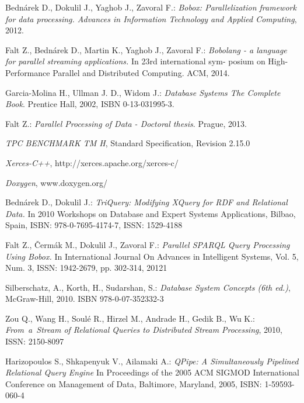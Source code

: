 
\def\bibname{Bibliography}
\begin{thebibliography}{99}
\addcontentsline{toc}{chapter}{\bibname}

  Bednárek D., Dokulil J., Yaghob J., Zavoral F.:
  \emph{Bobox: Parallelization
  framework for data processing. Advances in Information Technology and
  Applied Computing}, 2012.
  
   Falt Z., Bednárek D., Martin K., Yaghob J., Zavoral F.:
  \emph{Bobolang - a language for parallel streaming applications.}  In 23rd international sym-
      posium on High-Performance Parallel and Distributed Computing. ACM,
      2014.
  
   Garcia-Molina H., Ullman J. D., Widom  J.:
  \emph{Database Systems The Complete Book}. Prentice Hall, 2002,
 ISBN 0-13-031995-3.

  Falt Z.:
  \emph{Parallel Processing of Data - Doctoral thesis}. Prague, 2013.

 \emph{ TPC BENCHMARK TM H},
 Standard Specification, Revision 2.15.0

 \emph{ Xerces-C++},
http://xerces.apache.org/xerces-c/

 \emph{ Doxygen},
www.doxygen.org/

   Bednárek D., Dokulil J.:
 \emph{ TriQuery: Modifying XQuery for RDF and Relational Data.} In 2010 Workshops on Database and Expert Systems Applications, Bilbao, Spain,  ISBN: 978-0-7695-4174-7, ISSN: 1529-4188 
 
 
 Falt Z., Čermák M., Dokulil J., Zavoral F.:
  \emph{Parallel SPARQL Query Processing Using Bobox.} In International Journal On Advances in Intelligent Systems, Vol. 5, Num. 3, ISSN: 1942-2679, pp. 302-314, 20121
 
 Silberschatz, A., Korth, H., Sudarshan, S.:
  \emph{Database System Concepts (6th ed.)}, McGraw-Hill, 2010. ISBN 978-0-07-352332-3
 
 Zou Q., Wang H., Soulé R., Hirzel M., Andrade H., Gedik B., Wu K.:
   \emph{From~a~Stream of Relational Queries to Distributed Stream Processing}, 2010, ISSN:  2150-8097 
 
 Harizopoulos S., Shkapenyuk V., Ailamaki A.:
   \emph{QPipe: A Simultaneously Pipelined Relational Query Engine} In Proceedings of the 2005 ACM SIGMOD International Conference on Management of Data, Baltimore, Maryland, 2005, ISBN: 1-59593-060-4
 
 
\end{thebibliography}
